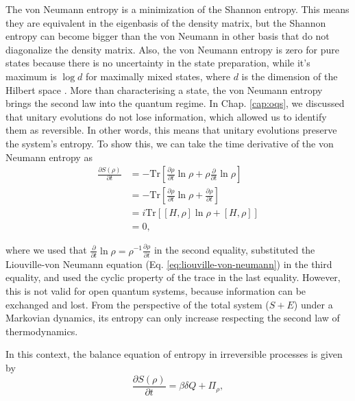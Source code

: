 \noindent The von Neumann entropy is a minimization of the Shannon entropy. This means they are equivalent in the eigenbasis of the density matrix, but the Shannon entropy can become bigger than the von Neumann in other basis that do not diagonalize the density matrix. Also, the von Neumann entropy is zero for pure states because there is no uncertainty in the state preparation, while it's maximum is $\log d$ for maximally mixed states, where $d$ is the dimension of the Hilbert space \cite{chuang-book}. More than characterising a state, the von Neumann entropy brings the second law into the quantum regime. In Chap. \ref{cap:oqs}, we discussed that unitary evolutions do not lose information, which allowed us to identify them as reversible. In other words, this means that unitary evolutions preserve the system's entropy. To show this, we can take the time derivative of the von Neumann entropy as
\begin{equation}
    \begin{split}
        \frac{\partial S(\rho)}{\partial t} &= - \text{Tr}\left[\frac{\partial \rho}{\partial t} \ln {\rho} + \rho \frac{\partial}{\partial t} \ln \rho \right]\\
        &= - \text{Tr}\left[\frac{\partial \rho}{\partial t} \ln {\rho} + \frac{\partial \rho}{\partial t} \right]\\
        &= i \text{Tr}\left[[H, \rho] \ln {\rho} + [H, \rho]\right]\\
        &= 0,
    \end{split}
\end{equation}

\noindent where we used that $\frac{\partial}{\partial t} \ln \rho = \rho^{-1} \frac{\partial \rho}{\partial t}$ in the second equality, substituted the Liouville-von Neumann equation (Eq. \eqref{eq:liouville-von-neumann}) in the third equality, and used the cyclic property of the trace in the last equality. However, this is not valid for open quantum systems, because information can be exchanged and lost. From the perspective of the total system ($S+E$) under a Markovian dynamics, its entropy can only increase respecting the second law of thermodynamics. 

In this context, the balance equation of entropy in irreversible processes is given by
\begin{equation}
    \frac{\partial S(\rho)}{\partial t} = \beta \delta Q + \Pi_\rho,
\end{equation}

